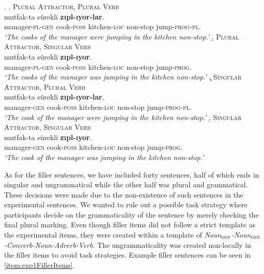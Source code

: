 \documentclass[doc,a4paper,man,natbib,floatsintext,noextraspace]{apa6}\usepackage[]{graphicx}\usepackage[]{color}
\begin{document}
\ex. \label{item:exp1ExperimentalItems}
%
\a. \textsc{Plural Attractor, Plural Verb} \label{item:exp1expitem-plpl}\\ 
   mutfak-ta sürekli \textbf{zıpl-ıyor-lar}.\\ 
  manager-\textsc{pl}-\textsc{gen}  cook-\textsc{poss} kitchen-\textsc{loc} non-stop  jump-\textsc{prog}-\textsc{pl}.\\
  \glt \textit{`The cooks of the manager were jumping in the kitchen non-stop.'}
%
\b. \textsc{Plural Attractor, Singular Verb} \label{item:exp1expitem-plsg}\\ 
   mutfak-ta sürekli \textbf{zıpl-ıyor}.\\ 
  manager-\textsc{pl}-\textsc{gen}  cook-\textsc{poss} kitchen-\textsc{loc} non-stop  jump-\textsc{prog}.\\
  \glt \textit{`The cooks of the manager was jumping in the kitchen non-stop.'}
%
\c. \textsc{Singular Attractor, Plural Verb} \label{item:exp1expitem-sgpl}\\ 
   mutfak-ta sürekli \textbf{zıpl-ıyor-lar}.\\ 
  manager-\textsc{gen}  cook-\textsc{poss} kitchen-\textsc{loc} non-stop  jump-\textsc{prog}-\textsc{pl}.\\
  \glt \textit{`The cook of the manager were jumping in the kitchen non-stop.'}
%
\d. \textsc{Singular Attractor, Singular Verb}\label{item:exp1expitem-sgsg}\\ 
   mutfak-ta sürekli \textbf{zıpl-ıyor}. \\ 
  manager-\textsc{gen}  cook-\textsc{poss} kitchen-\textsc{loc} non-stop  jump-\textsc{prog}.\\
  \glt \textit{`The cook of the manager was jumping in the kitchen non-stop.'}

As for the filler sentences, we have included forty sentences, half of which ends in singular and ungrammatical while the other half was plural and grammatical. These decisions were made due to the non-existence of such sentences in the experimental sentences. We wanted to rule out a possible task strategy where participants decide on the grammaticality of the sentence by merely checking the final plural marking. Even though filler items did not follow a strict template as the experimental items, they were created within a template of \textit{Noun$_{{\textsc{gen}}}$-Noun$_{{\textsc{gen}}}$-Converb-Noun-Adverb-Verb}. The ungrammaticality was created non-locally in the filler items to avoid task strategies. Example filler sentences can be seen in \ref{item:exp1FillerItems}.
\end{document}

